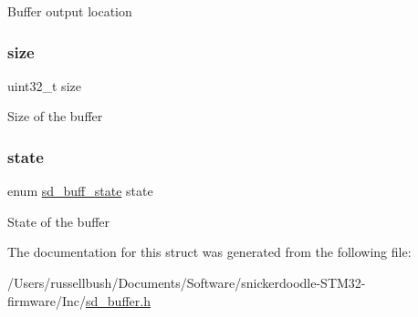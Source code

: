 Buffer output location \mbox{\label{structsd__char__buff_ab2c6b258f02add8fdf4cfc7c371dd772}} 
\subsubsection{\texorpdfstring{size}{size}}
{\footnotesize\ttfamily uint32\+\_\+t size}

Size of the buffer \mbox{\label{structsd__char__buff_aa88ff4ca3b7aaba9e9aaa27fd9ea94a9}} 
\subsubsection{\texorpdfstring{state}{state}}
{\footnotesize\ttfamily enum \mbox{\hyperlink{group___s_d___buffer___types_ga52f14e9c7b7d9ba092e1cd615559012b}{sd\+\_\+buff\+\_\+state}} state}

State of the buffer 

The documentation for this struct was generated from the following file\+:\begin{DoxyCompactItemize}
\item 
/\+Users/russellbush/\+Documents/\+Software/snickerdoodle-\/\+S\+T\+M32-\/firmware/\+Inc/\mbox{\hyperlink{sd__buffer_8h}{sd\+\_\+buffer.\+h}}\end{DoxyCompactItemize}
